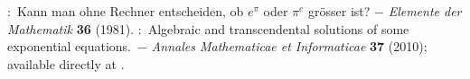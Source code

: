 \documentclass[12pt]{article}
\theoremstyle{definition}
\begin{document}
\begin{thebibliography}{8}
:\, Kann man ohne Rechner entscheiden, ob $e^\pi$ oder $\pi^e$ gr\"osser ist? $-$ \emph{Elemente der Mathematik} \textbf{36} (1981).
:\, Algebraic and transcendental solutions
of some exponential equations.\, $-$ \emph{Annales Mathematicae et Informaticae} \textbf{37} (2010); available directly at .
\end{thebibliography}

\end{document}
